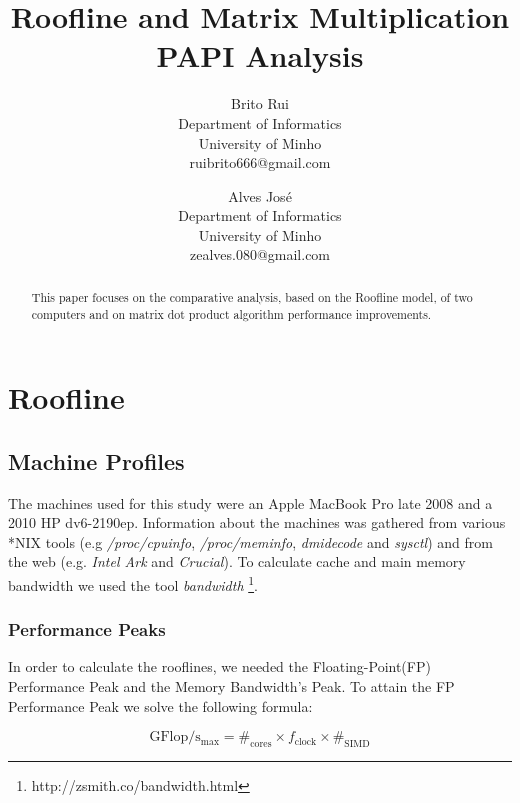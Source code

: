\documentclass[a4paper,10pt,openright,openbib,twocolumn]{article}
\begin{document}
\begin{multicols}{2}
\title{Roofline and Matrix Multiplication PAPI Analysis}
\author{
    Brito Rui\\
    Department of Informatics\\
    University of Minho\\
    ruibrito666@gmail.com
  \and
    Alves José\\
    Department of Informatics\\
    University of Minho\\
    zealves.080@gmail.com
}
\date{}
\maketitle
\end{multicols}

\begin{abstract}
	
	This paper focuses on the comparative analysis, based on the Roofline model\cite{roofline}, of two computers and on matrix dot product algorithm performance improvements.

\end{abstract}

\section{Roofline}
\subsection{Machine Profiles}
The machines used for this study were an Apple MacBook Pro late 2008 and a 2010 HP dv6-2190ep.
Information about the machines was gathered from various *NIX tools (e.g \emph{/proc/cpuinfo}, \emph{/proc/meminfo}, \emph{dmidecode} and \emph{sysctl}) and from the web (e.g. \emph{Intel Ark} and \emph{Crucial}). To calculate cache and main memory bandwidth we used the tool \emph{bandwidth} \footnote{http://zsmith.co/bandwidth.html}.

\subsubsection{Performance Peaks}
In order to calculate the rooflines, we needed the Floating-Point(FP) Performance Peak and the Memory Bandwidth's Peak. 
To attain the FP Performance Peak we solve the following formula:

$$\mathrm{GFlop/s_{max}} =  \#_{\mathrm{cores}} \times f_{\mathrm{clock}} \times \#_{\mathrm{SIMD}}$$
\end{document}
